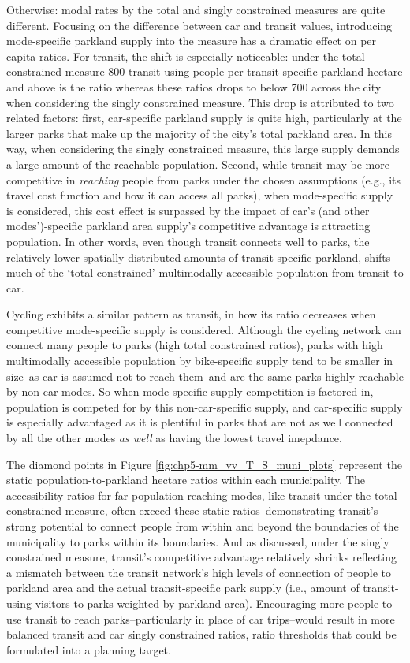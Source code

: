 \documentclass[
11pt, %
oneside, %
english, %
singlespacing, %
]{macthesis} %
\begin{document}
Otherwise: modal rates by the total and singly constrained measures are quite different. Focusing on the difference between car and transit values, introducing mode-specific parkland supply into the measure has a dramatic effect on per capita ratios. For transit, the shift is especially noticeable: under the total constrained measure 800 transit-using people per transit-specific parkland hectare and above is the ratio whereas these ratios drops to below 700 across the city when considering the singly constrained measure. This drop is attributed to two related factors: first, car-specific parkland supply is quite high, particularly at the larger parks that make up the majority of the city's total parkland area. In this way, when considering the singly constrained measure, this large supply demands a large amount of the reachable population. Second, while transit may be more competitive in \emph{reaching} people from parks under the chosen assumptions (e.g., its travel cost function and how it can access all parks), when mode-specific supply is considered, this cost effect is surpassed by the impact of car's (and other modes')-specific parkland area supply's competitive advantage is attracting population. In other words, even though transit connects well to parks, the relatively lower spatially distributed amounts of transit-specific parkland, shifts much of the `total constrained' multimodally accessible population from transit to car.

Cycling exhibits a similar pattern as transit, in how its ratio decreases when competitive mode-specific supply is considered. Although the cycling network can connect many people to parks (high total constrained ratios), parks with high multimodally accessible population by bike-specific supply tend to be smaller in size--as car is assumed not to reach them--and are the same parks highly reachable by non-car modes. So when mode-specific supply competition is factored in, population is competed for by this non-car-specific supply, and car-specific supply is especially advantaged as it is plentiful in parks that are not as well connected by all the other modes \emph{as well} as having the lowest travel imepdance.

The diamond points in Figure \ref{fig:chp5-mm_vv_T_S_muni_plots} represent the static population-to-parkland hectare ratios within each municipality. The accessibility ratios for far-population-reaching modes, like transit under the total constrained measure, often exceed these static ratios--demonstrating transit's strong potential to connect people from within and beyond the boundaries of the municipality to parks within its boundaries. And as discussed, under the singly constrained measure, transit's competitive advantage relatively shrinks reflecting a mismatch between the transit network's high levels of connection of people to parkland area and the actual transit-specific park supply (i.e., amount of transit-using visitors to parks weighted by parkland area). Encouraging more people to use transit to reach parks--particularly in place of car trips--would result in more balanced transit and car singly constrained ratios, ratio thresholds that could be formulated into a planning target.
\end{document}

